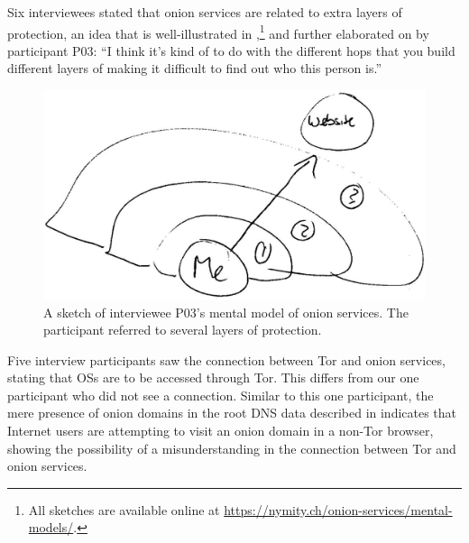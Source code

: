 Six interviewees stated that onion services are related to extra layers of
protection, an idea that is well-illustrated in
,\footnote{All sketches are available online at
\url{https://nymity.ch/onion-services/mental-models/}.} and further elaborated
on by participant P03: ``I think it's kind of to do with the different hops that
you build different layers of making it difficult to find out who this person
is.''

\begin{figure}[t]
  \centering
  \includegraphics[width=0.8\linewidth]{figures/p03-os-sketch-kopia2.jpg}
  \caption{A sketch of interviewee P03's mental model of onion services.  The
  participant referred to several layers of protection.}
  \label{fig:os-sketch}
\end{figure}

Five interview participants saw the connection between Tor and onion services,
stating that OSs are to be accessed through Tor.  This differs from our one
participant who did not see a connection.  Similar to this one participant, the mere presence 
of onion domains in the root DNS data described in  indicates that
Internet users are attempting to visit an onion domain in a non-Tor browser, showing the 
possibility of a misunderstanding in the connection between Tor and onion services.



